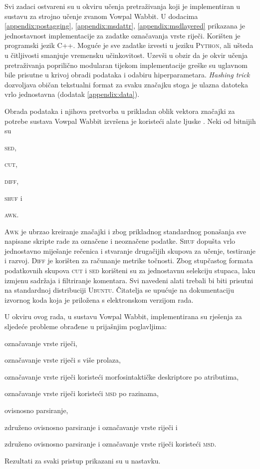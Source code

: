 Svi zadaci ostvareni su u okviru učenja pretraživanja koji je implementiran u
sustavu za strojno učenje zvanom Vowpal Wabbit. U dodacima
\ref{appendix:postagging}, \ref{appendix:msdattr}, \ref{appendix:msdlayered}
prikazana je jednostavnost implementacije za zadatke označavanja vrste riječi.
Korišten je programski jezik \textsc{C++}. Moguće je sve zadatke izvesti u
jeziku \textsc{Python}, ali ušteda u čitljivosti smanjuje vremensku
učinkovitost. Uzevši u obzir da je okvir učenja pretraživanja poprilično
modularan tijekom implementacije greške su uglavnom bile prisutne u krivoj
obradi podataka i odabiru hiperparametara. \textit{Hashing trick} dozvoljava
običan tekstualni format za svaku značajku stoga je ulazna datoteka vrlo
jednostavna (dodatak \ref{appendix:data}).

Obrada podataka i njihova pretvorba u prikladan oblik vektora značajki za
potrebe sustava Vowpal Wabbit izvršena je koristeći alate ljuske .
Neki od  bitnijih su
\begin{inlinelist}
  \item \textsc{sed},
  \item \textsc{cut},
  \item \textsc{diff},
  \item \textsc{shuf} i
  \item \textsc{awk}.
\end{inlinelist}
\textsc{Awk} je ubrzao kreiranje značajki i zbog prikladnog standardnog
ponašanja sve napisane skripte rade za označene i neoznačene podatke.
\textsc{Shuf} dopušta vrlo jednostavno miješanje rečenica i stvaranje drugačijih
skupova za učenje, testiranje i razvoj. \textsc{Diff} je korišten za računanje
metrike točnosti. Zbog stupčastog formata podatkovnih skupova \textsc{cut} i
\textsc{sed} korišteni su za jednostavnu selekciju stupaca, laku izmjenu
sadržaja i filtriranje komentara. Svi navedeni alati trebali bi biti prisutni na
standardnoj distribuciji \textsc{Ubuntu}. Čitatelja se upućuje na dokumentaciju
izvornog koda koja je priložena s elektronskom verzijom rada.

U okviru ovog rada, u sustavu Vowpal Wabbit, implementirana su rješenja za
sljedeće probleme obrađene u prijašnjim poglavljima:
\begin{inlinelist}
  \item označavanje vrste riječi,
  \item označavanje vrste riječi s više prolaza,
  \item označavanje vrste riječi koristeći morfosintaktičke deskriptore
   po atributima,
  \item označavanje vrste riječi koristeći \textsc{msd} po
  razinama,
  \item ovisnosno parsiranje,
  \item združeno ovisnosno parsiranje i označavanje vrste riječi i
  \item združeno ovisnosno parsiranje i označavanje vrste riječi koristeći
  \textsc{msd}.
\end{inlinelist}
Rezultati za svaki pristup prikazani su u nastavku.

